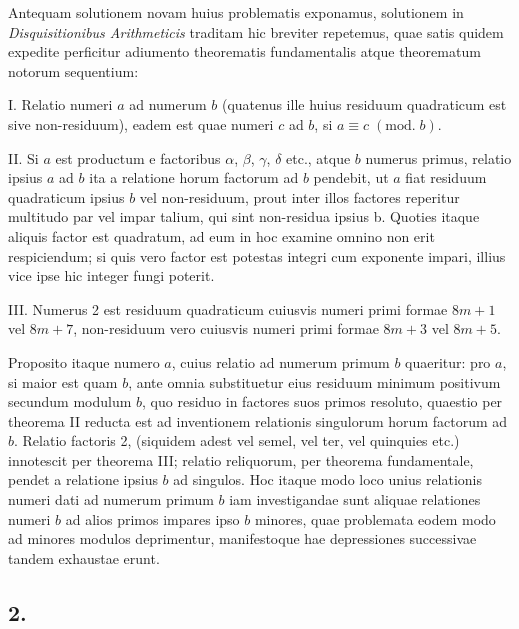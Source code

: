 \documentclass[twoside,12pt, showframe]{memoir}
\renewcommand{\pmod}[1]{\;(\textrm{mod.}\;#1)}
\begin{document}
Antequam solutionem novam huius problematis exponamus, solutionem in \textit{Disquisitionibus Arithmeticis} traditam hic breviter repetemus, quae satis quidem expedite perficitur adiumento theorematis fundamentalis atque theorematum notorum sequentium:
 
I. Relatio numeri \(a\) ad numerum \(b\) (quatenus ille huius residuum quadraticum est sive non-residuum), eadem est quae numeri \(c\) ad \(b\), si \(a \equiv c\pmod{b}\).
 
II. Si \(a\) est productum e factoribus \(\alpha\), \(\beta\), \(\gamma\), \(\delta\) etc., atque \(b\) numerus primus, relatio ipsius \(a\) ad \(b\) ita a relatione horum factorum ad \(b\) pendebit, ut \(a\) fiat residuum quadraticum ipsius \(b\) vel non-residuum, prout inter illos factores reperitur multitudo par vel impar talium, qui sint non-residua ipsius b. Quoties itaque aliquis factor est quadratum, ad eum in hoc examine omnino non erit respiciendum; si quis vero factor est potestas integri cum exponente impari, illius vice ipse hic integer fungi poterit.
 
III. Numerus 2 est residuum quadraticum cuiusvis numeri primi formae \(8 m+1\) vel \(8 m+7\), non-residuum vero cuiusvis numeri primi formae \(8 m+3\) vel \(8 m+5\).\clearpage\noindent%
 
Proposito itaque numero \(a\), cuius relatio ad numerum primum \(b\) quaeritur: pro \(a\), si maior est quam \(b\), ante omnia substituetur eius residuum minimum positivum secundum modulum \(b\), quo residuo in factores suos primos resoluto, quaestio per theorema II reducta est ad inventionem relationis singulorum horum factorum ad \(b\). Relatio factoris 2, (siquidem adest vel semel, vel ter, vel quinquies etc.) innotescit per theorema III; relatio reliquorum, per theorema fundamentale, pendet a relatione ipsius \(b\) ad singulos. Hoc itaque modo loco unius relationis numeri dati ad numerum primum \(b\) iam investigandae sunt aliquae relationes numeri \(b\) ad alios primos impares ipso \(b\) minores, quae problemata eodem modo ad minores modulos deprimentur, manifestoque hae depressiones successivae tandem exhaustae erunt.

\subsection*{2.}
 
\end{document}
